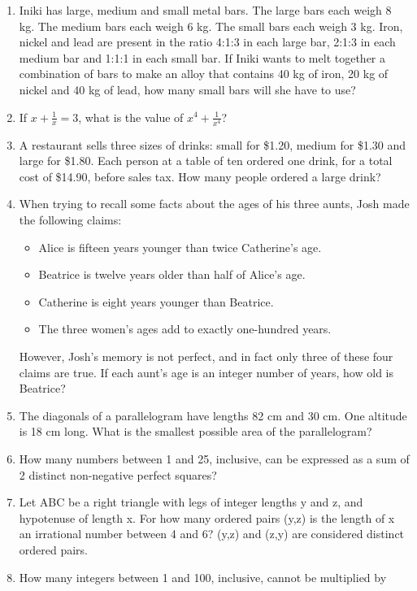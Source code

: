 \documentclass[12pt]{article}
\begin{document}
\begin{enumerate}
\bigskip
\item Iniki has large, medium and small metal bars. The large bars each weigh 8 kg.
The medium bars each weigh 6 kg. The small bars each weigh 3 kg. Iron, nickel
and lead are present in the ratio 4:1:3 in each large bar, 2:1:3 in each medium
bar and 1:1:1 in each small bar. If Iniki wants to melt together a combination of
bars to make an alloy that contains 40 kg of iron, 20 kg of nickel
and 40 kg of lead, how many small bars will she have to use?
\bigskip
\item If $x + \frac{1}{x} = 3$, what is the value of $x^4+\frac{1}{x^4}$?
\bigskip
\item A restaurant sells three sizes of drinks: small for \$1.20, medium for \$1.30 and
large for \$1.80. Each person at a table of ten ordered one drink, for a total cost
of \$14.90, before sales tax. How many people ordered a large drink?
\bigskip
\bigskip
\item When trying to recall some facts about the ages of his three aunts, Josh made the
following claims:
\begin{itemize}
\item Alice is fifteen years younger than twice Catherine’s age.
\item Beatrice is twelve years older than half of Alice’s age.
\item Catherine is eight years younger than Beatrice.
\item The three women’s ages add to exactly one-hundred years.
\end{itemize}
However, Josh’s memory is not perfect, and in fact only three of these four
claims are true. If each aunt’s age is an integer number of years, how old is
Beatrice?
\bigskip
\item The diagonals of a parallelogram have lengths 82 cm and 30 cm. One altitude is
18 cm long. What is the smallest possible area of the parallelogram?
\bigskip
\item   How many numbers between 1 and 25, inclusive, can be expressed as a sum of 2
distinct non-negative perfect squares?
\bigskip
\item Let ABC be a right triangle with legs of integer lengths y and z, and
hypotenuse of length x. For how many ordered pairs (y,z) is the length of x
an irrational number between 4 and 6? (y,z) and (z,y) are considered distinct
ordered pairs.
\bigskip
\item How many integers between 1 and 100, inclusive, cannot be multiplied by

\end{enumerate}
\end{document}
